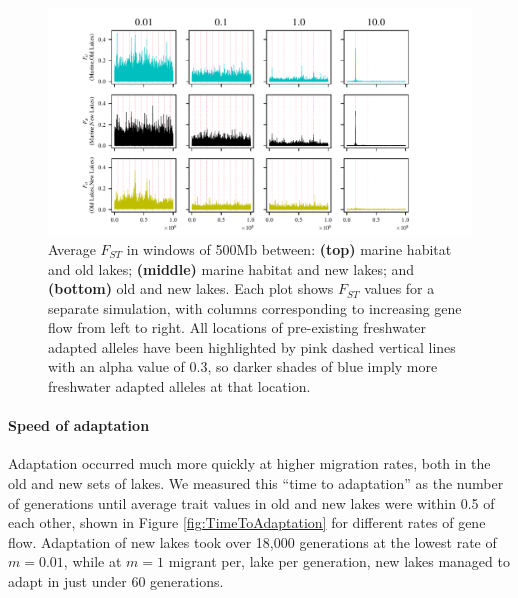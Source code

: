 \documentclass{article}
\begin{document}
\begin{figure}
	\begin{center}
        \includegraphics[width=\textwidth]{Final_Plots/Fst_Genome_faa_pos.pdf}
  		\caption{
		Average $F_{ST}$ in windows of 500Mb between:
        		\textbf{(top)} marine habitat and old lakes;
        		\textbf{(middle)} marine habitat and new lakes; and
        		\textbf{(bottom)} old and new lakes.
        		Each plot shows $F_{ST}$ values for a separate simulation,
        		with columns corresponding to increasing gene flow from left to right.
		All locations of pre-existing freshwater adapted alleles have been highlighted by 
		pink dashed vertical lines with an alpha value of 0.3, so darker shades of blue imply more 
		freshwater adapted alleles at that location.
     } \label{fig:Fst}
	\end{center}
\end{figure}

\paragraph*{Speed of adaptation}
Adaptation occurred much more quickly
at higher migration rates,
both in the old and new sets of lakes.
We measured this ``time to adaptation''
as the number of generations until 
average trait values in old and new lakes were within 0.5 of each other,
shown in Figure \ref{fig:TimeToAdaptation} for different rates of gene flow.
Adaptation of new lakes took over 18,000 generations at the lowest rate of $m = 0.01$,
while at $m = 1$ migrant per, lake per generation,
new lakes managed to adapt in just under 60 generations. 
\end{document}
